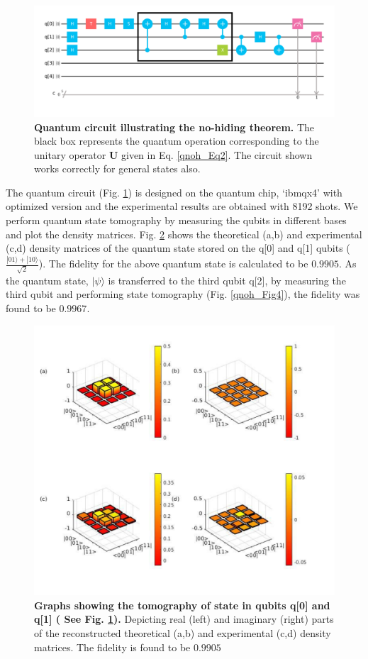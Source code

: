 \begin{figure}[H]
\includegraphics[scale=.4]{qnoh_Fig2}
\caption{\textbf{Quantum circuit illustrating the no-hiding theorem.} The black box represents the quantum operation corresponding to the unitary operator $\mathbf{U}$ given in Eq. \eqref{qnoh_Eq2}. The circuit shown works correctly for general states also.}
\label{qnoh_Fig2}
\end{figure}

The quantum circuit (Fig. \ref{qnoh_Fig2}) is designed on the quantum chip, `ibmqx4' with optimized version and the experimental results are obtained with 8192 shots. We perform quantum state tomography by measuring the qubits in different bases and plot the density matrices. Fig. \ref{qnoh_Fig3} shows the theoretical (a,b) and experimental (c,d) density matrices of the quantum state stored on the q[0] and q[1] qubits ($\frac{|01\rangle+|10\rangle}{\sqrt{2}}$). The fidelity for the above quantum state is calculated to be $0.9905$. As the quantum state, $|\psi\rangle$ is transferred to the third qubit q[2], by measuring the third qubit and performing state tomography (Fig. \ref{qnoh_Fig4}), the fidelity was found to be $0.9967$.

\begin{figure}[]
\includegraphics[scale=0.6]{qnoh_Fig3}
\caption{\textbf{Graphs showing the tomography of state in qubits q[0] and q[1] ( See Fig. \ref{qnoh_Fig2}).} Depicting real (left) and imaginary (right) parts of the reconstructed theoretical (a,b) and experimental (c,d) density matrices. The fidelity is found to be $0.9905$}
\label{qnoh_Fig3}
\end{figure}

